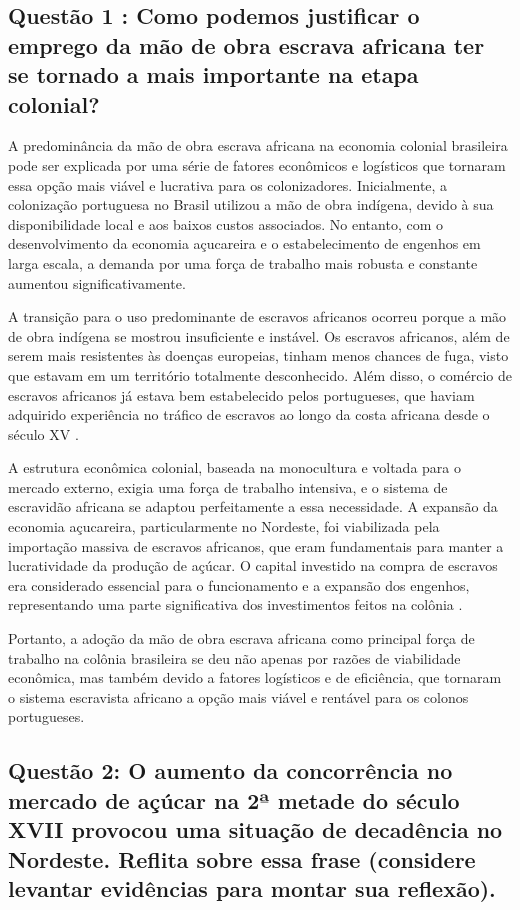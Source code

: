 \documentclass[a4paper,12pt]{article}[abntex2]
\begin{document}
\subsection{\textbf{Questão 1 : Como podemos justificar o emprego da mão de obra escrava africana ter se tornado a mais importante na etapa colonial?}}

A predominância da mão de obra escrava africana na economia colonial brasileira pode ser explicada por uma série de fatores econômicos e logísticos que tornaram essa opção mais viável e lucrativa para os colonizadores. Inicialmente, a colonização portuguesa no Brasil utilizou a mão de obra indígena, devido à sua disponibilidade local e aos baixos custos associados. No entanto, com o desenvolvimento da economia açucareira e o estabelecimento de engenhos em larga escala, a demanda por uma força de trabalho mais robusta e constante aumentou significativamente.

A transição para o uso predominante de escravos africanos ocorreu porque a mão de obra indígena se mostrou insuficiente e instável. Os escravos africanos, além de serem mais resistentes às doenças europeias, tinham menos chances de fuga, visto que estavam em um território totalmente desconhecido. Além disso, o comércio de escravos africanos já estava bem estabelecido pelos portugueses, que haviam adquirido experiência no tráfico de escravos ao longo da costa africana desde o século XV .

A estrutura econômica colonial, baseada na monocultura e voltada para o mercado externo, exigia uma força de trabalho intensiva, e o sistema de escravidão africana se adaptou perfeitamente a essa necessidade. A expansão da economia açucareira, particularmente no Nordeste, foi viabilizada pela importação massiva de escravos africanos, que eram fundamentais para manter a lucratividade da produção de açúcar. O capital investido na compra de escravos era considerado essencial para o funcionamento e a expansão dos engenhos, representando uma parte significativa dos investimentos feitos na colônia .

Portanto, a adoção da mão de obra escrava africana como principal força de trabalho na colônia brasileira se deu não apenas por razões de viabilidade econômica, mas também devido a fatores logísticos e de eficiência, que tornaram o sistema escravista africano a opção mais viável e rentável para os colonos portugueses.

\subsection{\textbf{Questão 2: O aumento da concorrência no mercado de açúcar na 2ª metade do século XVII provocou uma situação de decadência no Nordeste. Reflita sobre essa frase (considere levantar evidências para montar sua reflexão).}}
\end{document}
